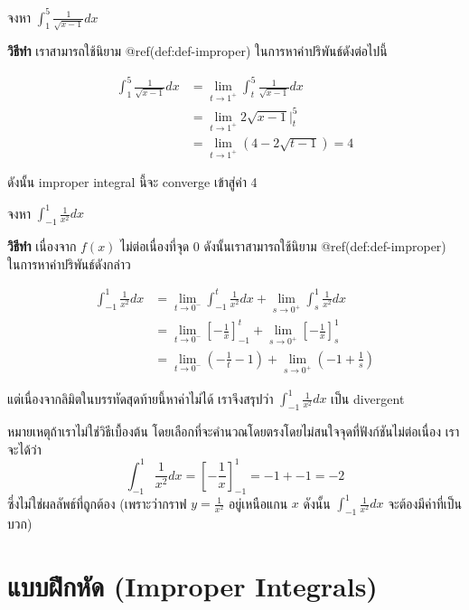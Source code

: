 \documentclass[
]{book}
\begin{document}
จงหา \(\int_{1}^{5} \frac{1}{\sqrt{x-1}} dx\)

\textbf{วิธีทำ} เราสามารถใช้นิยาม @ref(def:def-improper)
ในการหาค่าปริพันธ์ดังต่อไปนี้

\begin{equation}
\begin{aligned}
  \int_{1}^{5} \frac{1}{\sqrt{x-1}} dx &= \lim_{t \rightarrow 1^{+} }\int_{t}^{5} \frac{1}{\sqrt{x-1}} dx \\
         &= \lim_{t \rightarrow 1^{+}} 2\sqrt{x-1} |_{t}^{5} \\
         &= \lim_{t \rightarrow 1^{+}} (4 - 2\sqrt{t-1}) = 4    
\end{aligned}
\end{equation}

ดังนั้น improper integral นี้จะ converge เข้าสู่ค่า 4

จงหา \(\int_{-1}^{1} \frac{1}{x^2} dx\)

\textbf{วิธีทำ} เนื่องจาก \(f(x)\) ไม่ต่อเนื่องที่จุด 0 ดังนั้นเราสามารถใช้นิยาม
@ref(def:def-improper) ในการหาค่าปริพันธ์ดังกล่าว

\begin{equation}
\begin{aligned}
        \int_{-1}^{1} \frac{1}{x^2} dx &= \lim_{t \rightarrow 0^{-} }\int_{-1}^{t} \frac{1}{x^2}dx
                                            + \lim_{s \rightarrow 0^{+}} \int_{s}^{1} \frac{1}{x^2}dx \\
        &= \lim_{t \rightarrow 0^{-}} \left[ -\frac{1}{x}\right]_{-1}^t 
        + \lim_{s \rightarrow 0^{+}} \left[ -\frac{1}{x}\right]_{s}^1 \\
        &= \lim_{t \rightarrow 0^{-}} (-\frac{1}{t} - 1) + \lim_{s \rightarrow 0^{+}} (-1 +\frac{1}{s})
\end{aligned}
\end{equation}

แต่เนื่องจากลิมิตในบรรทัดสุดท้ายนี้หาค่าไม่ได้ เราจึงสรุปว่า
\(\int_{-1}^{1} \frac{1}{x^2} dx\) เป็น divergent

หมายเหตุถ้าเราไม่ใช่วิธีเบื้องต้น โดยเลือกที่จะคำนวณโดยตรงโดยไม่สนใจจุดที่ฟังก์ชันไม่ต่อเนื่อง
เราจะได้ว่า
\[\int_{-1}^{1} \frac{1}{x^2} dx  = \left[ -\frac{1}{x}\right]_{-1}^1 = -1 + -1 = -2\]
ซึ่งไม่ใช่ผลลัพธ์ที่ถูกต้อง (เพราะว่ากราฟ \(y = \frac{1}{x^2}\) อยู่เหนือแกน \(x\)
ดังนั้น \(\int_{-1}^{1} \frac{1}{x^2} dx\) จะต้องมีค่าที่เป็นบวก)

\section{แบบฝึกหัด (Improper
Integrals)}\label{uxe41uxe1auxe1auxe1duxe01uxe2buxe14-improper-integrals}
\end{document}
